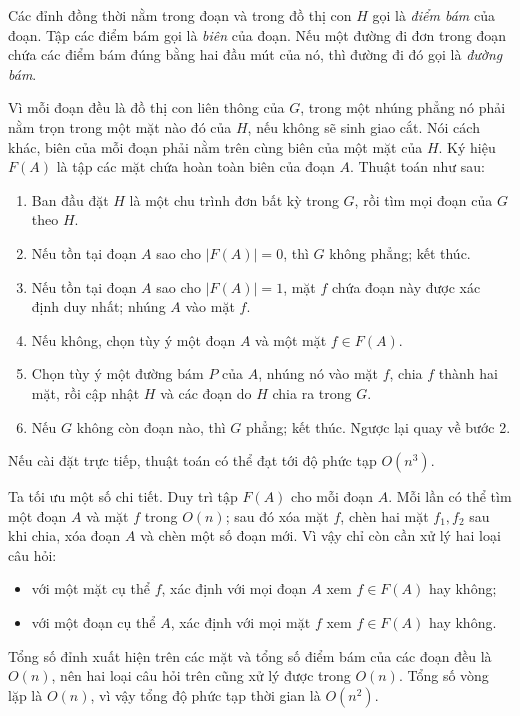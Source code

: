 \documentclass[11pt]{article}
\begin{document}
Các đỉnh đồng thời nằm trong đoạn và trong đồ thị con $H$ gọi là \emph{điểm bám}
của đoạn. Tập các điểm bám gọi là \emph{biên} của đoạn. Nếu một đường đi đơn
trong đoạn chứa các điểm bám đúng bằng hai đầu mút của nó, thì đường đi đó gọi
là \emph{đường bám}.

Vì mỗi đoạn đều là đồ thị con liên thông của $G$, trong một nhúng phẳng nó phải
nằm trọn trong một mặt nào đó của $H$, nếu không sẽ sinh giao cắt. Nói cách
khác, biên của mỗi đoạn phải nằm trên cùng biên của một mặt của $H$. Ký hiệu
$F(A)$ là tập các mặt chứa hoàn toàn biên của đoạn $A$. Thuật toán như sau:
\begin{enumerate}
  \item Ban đầu đặt $H$ là một chu trình đơn bất kỳ trong $G$, rồi tìm mọi đoạn
  của $G$ theo $H$.
  \item Nếu tồn tại đoạn $A$ sao cho $|F(A)|=0$, thì $G$ không phẳng; kết thúc.
  \item Nếu tồn tại đoạn $A$ sao cho $|F(A)|=1$, mặt $f$ chứa đoạn này được xác
  định duy nhất; nhúng $A$ vào mặt $f$.
  \item Nếu không, chọn tùy ý một đoạn $A$ và một mặt $f\in F(A)$.
  \item Chọn tùy ý một đường bám $P$ của $A$, nhúng nó vào mặt $f$, chia $f$
  thành hai mặt, rồi cập nhật $H$ và các đoạn do $H$ chia ra trong $G$.
  \item Nếu $G$ không còn đoạn nào, thì $G$ phẳng; kết thúc. Ngược lại quay về
  bước 2.
\end{enumerate}

Nếu cài đặt trực tiếp, thuật toán có thể đạt tới độ phức tạp $O(n^3)$.

Ta tối ưu một số chi tiết. Duy trì tập $F(A)$ cho mỗi đoạn $A$. Mỗi lần có thể
tìm một đoạn $A$ và mặt $f$ trong $O(n)$; sau đó xóa mặt $f$, chèn hai mặt
$f_1,f_2$ sau khi chia, xóa đoạn $A$ và chèn một số đoạn mới. Vì vậy chỉ còn
cần xử lý hai loại câu hỏi:
\begin{itemize}
  \item với một mặt cụ thể $f$, xác định với mọi đoạn $A$ xem $f\in F(A)$ hay
  không;
  \item với một đoạn cụ thể $A$, xác định với mọi mặt $f$ xem $f\in F(A)$ hay
  không.
\end{itemize}

Tổng số đỉnh xuất hiện trên các mặt và tổng số điểm bám của các đoạn đều là
$O(n)$, nên hai loại câu hỏi trên cũng xử lý được trong $O(n)$. Tổng số vòng
lặp là $O(n)$, vì vậy tổng độ phức tạp thời gian là $O(n^2)$.
\end{document}
